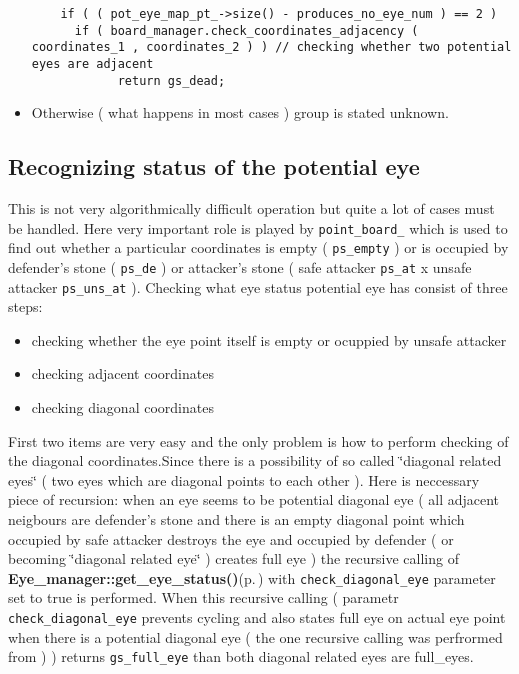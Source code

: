 \begin{itemize}
\footnotesize\begin{verbatim}    if ( ( pot_eye_map_pt_->size() - produces_no_eye_num ) == 2 )
      if ( board_manager.check_coordinates_adjacency ( coordinates_1 , coordinates_2 ) ) // checking whether two potential eyes are adjacent
            return gs_dead;
\end{verbatim}
\normalsize
\item Otherwise ( what happens in most cases ) group is stated unknown.\end{itemize}
\subsection{Recognizing status of the potential eye}\label{page_4_page_4__sec_2}
This is not very algorithmically difficult operation but quite a lot of cases must be handled. Here very important role is played by {\tt point\_\-board\_\-} which is used to find out whether a particular coordinates is empty ( {\tt ps\_\-empty} ) or is occupied by defender's stone ( {\tt ps\_\-de} ) or attacker's stone ( safe attacker {\tt ps\_\-at} x unsafe attacker {\tt ps\_\-uns\_\-at} ). Checking what eye status potential eye has consist of three steps:\begin{itemize}
\item checking whether the eye point itself is empty or ocuppied by unsafe attacker\item checking adjacent coordinates\item checking diagonal coordinates\end{itemize}


First two items are very easy and the only problem is how to perform checking of the diagonal coordinates.Since there is a possibility of so called \char`\"{}diagonal related eyes\char`\"{} ( two eyes which are diagonal points to each other ). Here is neccessary piece of recursion: when an eye seems to be potential diagonal eye ( all adjacent neigbours are defender's stone and there is an empty diagonal point which occupied by safe attacker destroys the eye and occupied by defender ( or becoming \char`\"{}diagonal related eye\char`\"{} ) creates full eye ) the recursive calling of {\bf Eye\_\-manager::get\_\-eye\_\-status()}{\rm (p.\,\pageref{classEye__manager_a0})} with {\tt check\_\-diagonal\_\-eye} parameter set to true is performed. When this recursive calling ( parametr {\tt check\_\-diagonal\_\-eye} prevents cycling and also states full eye on actual eye point when there is a potential diagonal eye ( the one recursive calling was perfrormed from ) ) returns {\tt gs\_\-full\_\-eye} than both diagonal related eyes are full\_\-eyes. 